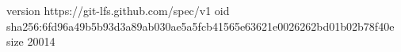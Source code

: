 version https://git-lfs.github.com/spec/v1
oid sha256:6fd96a49b5b93d3a89ab030ae5a5fcb41565e63621e0026262bd01b02b78f40e
size 20014
